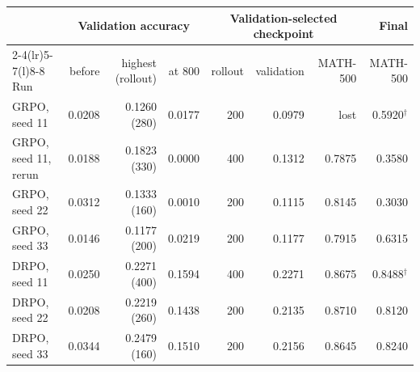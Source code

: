 \begin{tabularx}{\textwidth}{@{}Xrrrrrrr@{}}
\toprule
 & \multicolumn{3}{c}{Validation accuracy} & \multicolumn{3}{c}{Validation-selected checkpoint} & Final \\
\cmidrule(lr){2-4}\cmidrule(lr){5-7}\cmidrule(l){8-8}
Run & before & highest (rollout) & at 800 & rollout & validation & MATH-500 & MATH-500 \\
\midrule
GRPO, seed 11 & 0.0208 & 0.1260 (280) & 0.0177 & 200 & 0.0979 & lost & 0.5920$^{\dagger}$ \\
GRPO, seed 11, rerun & 0.0188 & 0.1823 (330) & 0.0000 & 400 & 0.1312 & 0.7875 & 0.3580 \\
GRPO, seed 22 & 0.0312 & 0.1333 (160) & 0.0010 & 200 & 0.1115 & 0.8145 & 0.3030 \\
GRPO, seed 33 & 0.0146 & 0.1177 (200) & 0.0219 & 200 & 0.1177 & 0.7915 & 0.6315 \\
DRPO, seed 11 & 0.0250 & 0.2271 (400) & 0.1594 & 400 & 0.2271 & 0.8675 & 0.8488$^{\dagger}$ \\
DRPO, seed 22 & 0.0208 & 0.2219 (260) & 0.1438 & 200 & 0.2135 & 0.8710 & 0.8120 \\
DRPO, seed 33 & 0.0344 & 0.2479 (160) & 0.1510 & 200 & 0.2156 & 0.8645 & 0.8240 \\
\bottomrule
\end{tabularx}
